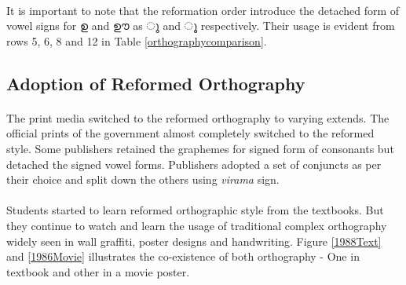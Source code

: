 \documentclass[10pt]{article}
\begin{document}
\paragraph{}
It is important to note that the reformation order introduce the detached form of vowel signs for {\manjari ഉ } and {\manjari ഊ } as {\manjari ു } and {\manjari ൂ } respectively. Their usage is evident from rows 5, 6, 8 and 12 in Table \ref{orthographycomparison}.

\subsection{Adoption of Reformed Orthography}
\paragraph{}
The print media switched to the reformed orthography to varying extends. The official prints of the government almost completely switched to the reformed style. Some publishers retained the graphemes for signed form of consonants but detached the signed vowel forms. Publishers adopted a set of conjuncts as per their choice and split down the others using \textit{virama} sign.
\paragraph{}
Students started to learn reformed orthographic style from the textbooks. But they continue to watch and learn the usage of traditional complex orthography widely seen in wall graffiti, poster designs and handwriting. Figure \ref{1988Text} and \ref{1986Movie} illustrates the co-existence of both orthography - One in textbook and other in a movie poster.
\end{document}
